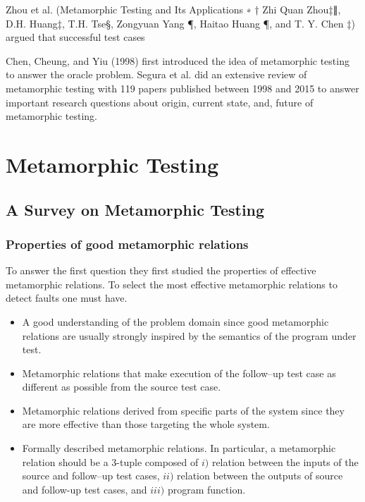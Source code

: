 Zhou et al. (Metamorphic Testing and Its Applications ∗ † Zhi Quan Zhou‡∥, D.H. Huang‡, T.H. Tse§,
Zongyuan Yang ¶, Haitao Huang ¶, and T. Y. Chen ‡) argued that successful test cases

Chen, Cheung, and Yiu (1998) first introduced the idea of metamorphic testing to answer the oracle problem.
Segura et al. did an extensive review of metamorphic testing with 119 papers published between 1998 and 2015 to answer important research questions about origin, current state, and, future of metamorphic testing.



\section{Metamorphic Testing}
	\subsection{A Survey on Metamorphic Testing \cite{Segura2016}}
		

		\subsubsection{Properties of good metamorphic relations}
			To answer the first question they first studied the properties of effective metamorphic relations. To select the most effective metamorphic relations to detect faults one must have.
			\begin{itemize}
				\item A good understanding of the problem domain since good metamorphic relations are usually strongly inspired by the semantics of the program under test.
				\item Metamorphic relations that make execution of the follow–up test case as different as possible from the source test case.
				\item Metamorphic relations derived from specific parts of the system since they are more effective than those targeting the whole system.
				\item Formally described metamorphic relations. In particular, a metamorphic relation should be a 3-tuple composed of $i)$ relation between the inputs of the source and follow–up test cases, $ii)$ relation between the outputs of source and follow-up test cases, and $iii)$ program function.
			\end{itemize}

